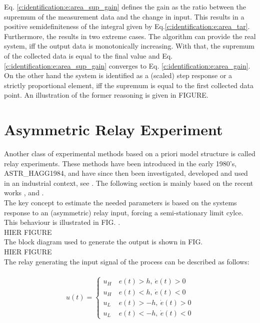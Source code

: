 Eq. \ref{c:identification:e:area_sup_gain} defines the gain as the ratio between the supremum of the measurement data and the change in input. This results in a positive semidefiniteness of the integral given by Eq.\ref{c:identification:e:area_tar}. Furthermore, the results in two extreme cases. The algorithm can provide the real system, iff the output data is monotonically increasing. With that, the supremum of the collected data is equal to the final value and Eq.\ref{c:identification:e:area_sup_gain} converges to Eq. \ref{c:identification:e:area_gain}. On the other hand the system is identified as a (scaled) step response or a strictly proportional element, iff the supremum is equal to the first collected data point. An illustration of the former reasoning is given in FIGURE.\\

\section{Asymmetric Relay Experiment}
\label{c:identification:s:relay}

Another class of experimental methods based on a priori model structure is called relay experiments. These methods have been introduced in the early 1980's, ASTR_HAGG1984, and have since then been investigated, developed and used in an industrial context, see . The following section is mainly based on the recent works \cite{Berner2016a}, \cite{Berner2015} and \cite{Berner2014a}.\\

The key concept to estimate the needed parameters is based on the systems response to an (asymmetric) relay input, forcing a semi-stationary limit cylce. This behaviour is illustrated in FIG. .\\

HIER FIGURE \\

The block diagram used to generate the output is shown in FIG. \\

HIER FIGURE \\

The relay generating the input signal of the process can be described as follows:

\begin{align}
\begin{split}
u(t) = \begin{cases}
u_H &~e(t) > h, ~\dot{e}(t) > 0 \\
u_H &~e(t) < h, ~\dot{e}(t) < 0\\
u_L &~e(t) > -h,~\dot{e}(t) > 0\\
u_L &~e(t) < -h, ~\dot{e}(t) < 0
\end{cases}
\end{split}
\label{c:identification:e:relay_output}
\end{align}

